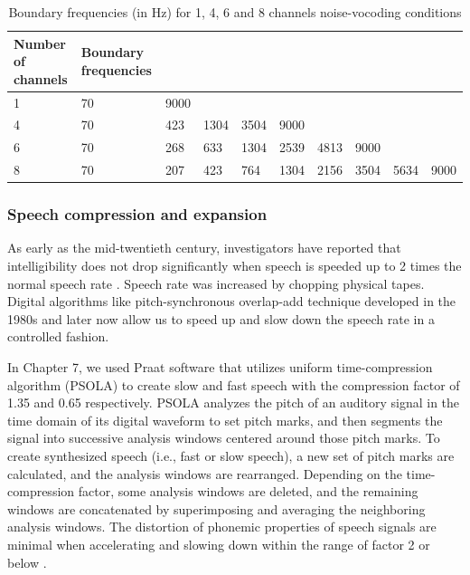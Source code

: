 \documentclass[a4paper, nobind]{templates/ociamthesis}
\begin{document}
\begin{table}[H]
\begin{center} 
\caption{Boundary frequencies (in Hz) for 1, 4, 6 and 8 channels noise-vocoding conditions} 
\label{frequencies} 
\vskip 0.12in
\begin{tabular}{llllllllll} 
\hline
Number of channels     &    Boundary frequencies \\
\hline
1   &   70    &   9000   &     &     &       &       &        &       &   \\

4   &   70    &   423   &   1304  &   3504  &   9000    &       &        &       &   \\

6   &   70    &   268   &   633   &   1304  &   2539    &   4813    &    9000    &       &   \\

8   &   70    &   207   &   423   &   764   &   1304    &   2156    &    3504    &   5634    &   9000\\
\hline
\end{tabular} 
\end{center} 
\end{table}

\hypertarget{speech-compression-and-expansion}{%
\subsubsection{Speech compression and expansion}\label{speech-compression-and-expansion}}

As early as the mid-twentieth century, investigators have reported that intelligibility does not drop significantly when speech is speeded up to 2 times the normal speech rate \autocite[e.g.,][]{Garvey1953}.
Speech rate was increased by chopping physical tapes.
Digital algorithms like pitch-synchronous overlap-add technique \autocites[PSOLA,][]{Charpentier1986,Moulines1990} developed in the 1980s and later \autocite[overlap-add technique based on waveform similarity,][]{Verhelst1993} now allow us to speed up and slow down the speech rate in a controlled fashion.

In Chapter 7, we used Praat software that utilizes uniform time-compression algorithm (PSOLA) to create slow and fast speech with the compression factor of 1.35 and 0.65 respectively.
PSOLA analyzes the pitch of an auditory signal in the time domain of its digital waveform to set pitch marks, and then segments the signal into successive analysis windows centered around those pitch marks.
To create synthesized speech (i.e., fast or slow speech), a new set of pitch marks are calculated, and the analysis windows are rearranged.
Depending on the time-compression factor, some analysis windows are deleted, and the remaining windows are concatenated by superimposing and averaging the neighboring analysis windows.
The distortion of phonemic properties of speech signals are minimal when accelerating and slowing down within the range of factor 2 or below \autocite{Moulines1990}.
\end{document}
